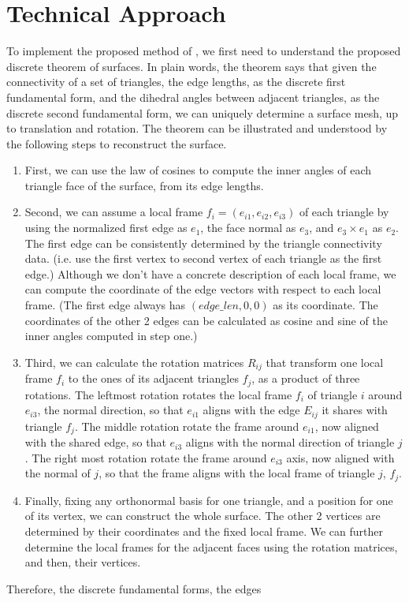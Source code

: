 \documentclass{6838publ}
\begin{document}
\section{Technical Approach}\label{sec:technical_approach} To
implement the proposed method of \cite{wang2012linear}, we first need
to understand the proposed discrete theorem of surfaces. In plain
words, the theorem says that given the connectivity of a set of
triangles, the edge lengths, as the discrete first fundamental form,
and the dihedral angles between adjacent triangles, as the discrete
second fundamental form, we can uniquely determine a surface mesh, up
to translation and rotation. The theorem can be illustrated and
understood by the following steps to reconstruct the surface.
\begin{enumerate}
\item First, we can use the law of cosines to compute the inner angles
of each triangle face of the surface, from its edge lengths.
\item Second, we can assume a local frame $f_{i} = (e_{i1}, e_{i2},
e_{i3})$ of each triangle by using the normalized first edge as $e_1$,
the face normal as $e_3$, and $e_3 \times e_1$ as $e_2$. The first
edge can be consistently determined by the triangle connectivity
data. (i.e. use the first vertex to second vertex of each triangle as
the first edge.) Although we don't have a concrete description of each
local frame, we can compute the coordinate of the edge vectors with
respect to each local frame. (The first edge always has $(edge\_len,
0, 0)$ as its coordinate. The coordinates of the other 2 edges can be
calculated as cosine and sine of the inner angles computed in step
one.)
\item Third, we can calculate the rotation matrices $R_{ij}$ that
transform one local frame $f_{i}$ to the ones of its adjacent
triangles $f_{j}$, as a product of three rotations. The leftmost
rotation rotates the local frame $f_{i}$ of triangle $i$ around
$e_{i3}$, the normal direction, so that $e_{i1}$ aligns with the edge
$E_{ij}$ it shares with triangle $f_{j}$. The middle rotation rotate
the frame around $e_{i1}$, now aligned with the shared edge, so that
$e_{i3}$ aligns with the normal direction of triangle $j$. The right
most rotation rotate the frame around $e_{i3}$ axis, now aligned with
the normal of $j$, so that the frame aligns with the local frame of
triangle $j$, $f_{j}$.
\item Finally, fixing any orthonormal basis for one triangle, and a
position for one of its vertex, we can construct the whole
surface. The other 2 vertices are determined by their coordinates and
the fixed local frame. We can further determine the local frames for
the adjacent faces using the rotation matrices, and then, their
vertices.
\end{enumerate} Therefore, the discrete fundamental forms, the edges
\end{document}
